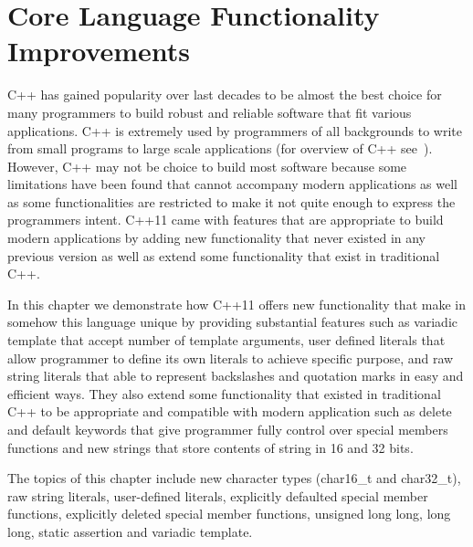 \documentclass[11pt]{report}
\begin{document}
\chapter{Core Language Functionality Improvements}
\label{chapter: Functionality Improvements}
C++ has gained popularity over last decades to be almost the best choice for many programmers to build robust and reliable software that fit various applications. C++ is extremely used by programmers of all backgrounds to write from small programs to large scale applications (for overview of C++ see~\cite{Stroustrup:2012:Cpp11}). However, C++ may not be choice to build most software because some limitations have been found  that cannot accompany modern applications as well as some functionalities are restricted to make it not quite enough to express the programmers intent. C++11 came with features that are appropriate to build modern applications by adding new functionality that never existed in any previous version  as well as extend some functionality that exist in traditional C++.

In this chapter we demonstrate how C++11 offers new functionality that make in somehow this language unique by providing substantial features such as variadic template that accept number of template arguments, user defined literals that allow programmer to define its own literals to achieve specific purpose, and raw string literals that able to represent backslashes and quotation marks in easy and efficient ways. They also extend some functionality that existed in traditional C++ to be appropriate and compatible with modern application such as delete and default keywords that give programmer fully control over special members functions and new strings that store contents of string in 16 and 32 bits.

The topics of this chapter include new character types (char16\_t and char32\_t), raw string literals, user-defined literals, explicitly defaulted special member functions, explicitly deleted special member functions, unsigned long long, long long, static assertion and variadic template.
\end{document}
